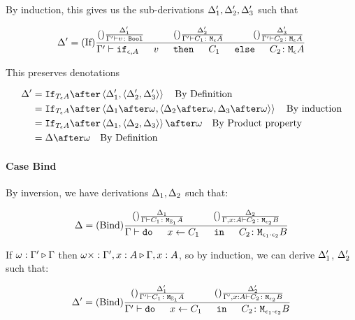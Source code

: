 {    By induction, this gives us the sub-derivations $\Delta_1', \Delta_2', \Delta_3'$ such that

    \begin{equation}
        \D' = \treerule{If}{
            \treerule{}{\D_1'}{\typerelation{\G'}{v}{\B}}
            \s\s
            \treerule{}{\D_2'}{\typerelation{\G'}{C_1}{\mea}}
            \s\s
            \treerule{}{\D_3'}{\typerelation{\G'}{C_2}{\mea}}
        }{
            \typerelation{\G'}{\ifthenelse{\e}{A}{v}{C_1}{C_2}}{\mea}
        }
    \end{equation}


    This preserves denotations

    \begin{align}
        \D' &= \ifnt{\tea}\after\pr{\D_1'}{\pr{\D_2'}{\D_3'}}\qt{By Definition}\\
            &= \ifnt{\tea}\after\pr{\D_1\after\w}{\pr{\D_2\after\w}{\D_3\after\w}}\qt{By induction}\\
            &= \ifnt{\tea}\after\pr{\D_1}{\pr{\D_2}{\D_3}}\after\w\qt{By Product property}\\
            &= \D\after\w\qt{By Definition}\\
    \end{align}

    \paragraph{Case Bind}
    By inversion, we have derivations $\Delta_1, \Delta_2$ such that:


    \begin{equation}
        \D = \treerule{Bind}{
            \treerule{}{\D_1}{\typerelation{\G}{C_1}{\M{\E_1}{A}}}
            \s\s
            \treerule{}{\D_2}{\typerelation{\G,x: A}{C_2}{\M{\e_2}{B}}}
        }{
            \typerelation{\G}{\doin{x}{C_1}{C_2}}{\M{\e_1\dot\e_2}{B}}
        }
    \end{equation}

    If $\omega : \Gamma' \triangleright \Gamma$ then $\omega\times : \Gamma',x:A \triangleright \Gamma, x: A$, so by induction, we can derive $\Delta_1'$, $\Delta_2'$ such that:

    \begin{equation}
        \D' = \treerule{Bind}{
            \treerule{}{\D_1'}{\typerelation{\G'}{C_1}{\M{\E_1}{A}}}
            \s\s
            \treerule{}{\D_2'}{\typerelation{\G',x: A}{C_2}{\M{\e_2}{B}}}
        }{
            \typerelation{\G'}{\doin{x}{C_1}{C_2}}{\M{\e_1\dot\e_2}{B}}
        }
    \end{equation}

}
